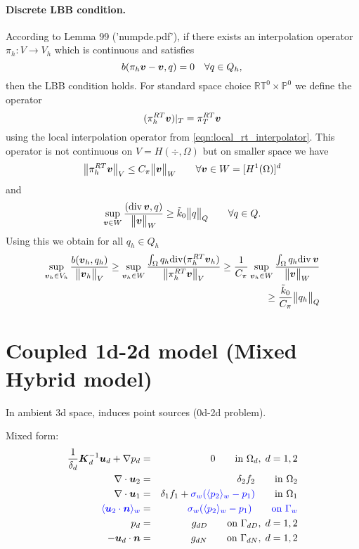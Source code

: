 \paragraph{Discrete LBB condition.}
According to Lemma 99 ('numpde.pdf'), if there exists an interpolation operator
$\pi_h: V\rightarrow V_h$ which is continuous and satisfies
\begin{equation}
    b(\pi_h\mathbf{\boldsymbol{v}}- \mathbf{\boldsymbol{v}}, q) = 0 \quad \forall q\in Q_h,\\ 
\end{equation}
then the LBB condition holds.
For standard space choice $\mathbb{RT}^0\times\mathbb{P}^0$ we define
the operator 
\begin{equation}
    (\pi^{RT}_h \mathbf{\boldsymbol{v}})|_T = \pi^{RT}_T \mathbf{\boldsymbol{v}}
\end{equation}
using the local interpolation operator from \eqref{eqn:local_rt_interpolator}.
This operator is not continuous on $V=H(\div,\Omega)$ but on
smaller space we have
\begin{equation}
    \bigl\Vert\pi^{RT}_h \mathbf{\boldsymbol{v}}\bigr\Vert_V \leq C_\pi \bigl\Vert\mathbf{\boldsymbol{v}}\bigr\Vert_W \qquad \forall \mathbf{\boldsymbol{v}}\in W=[H^1(\Omega)]^d
\end{equation}
and
\begin{equation}
    \sup_{\mathbf{\boldsymbol{v}}\in W} \frac{({\rm div}\,\mathbf{\boldsymbol{v}}, q)}{\bigl\Vert\mathbf{\boldsymbol{v}}\bigr\Vert_W} \geq \tilde{k}_0 \bigl\Vert q\bigr\Vert_Q \qquad \forall q\in Q.
\end{equation}
Using this we obtain for all $q_h\in Q_h$
\begin{align}
    \sup_{\mathbf{\boldsymbol{v}}_h\in V_h} \frac{b(\mathbf{\boldsymbol{v}}_h,q_h)}{\bigl\Vert\mathbf{\boldsymbol{v}}_h\bigr\Vert_V} \geq
    \sup_{\mathbf{\boldsymbol{v}}_h\in W} \frac{\int_{\Omega} q_h {\rm div} (\pi^{RT}_h \mathbf{\boldsymbol{v}}_h)}{\bigl\Vert\pi^{RT}_h \mathbf{\boldsymbol{v}}\bigr\Vert_V} \geq
    \frac{1}{C_\pi} \sup_{\mathbf{\boldsymbol{v}}_h\in W} \frac{\int_{\Omega} q_h {\rm div}\,\mathbf{\boldsymbol{v}}}{\bigl\Vert\mathbf{\boldsymbol{v}}\bigr\Vert_W}
    \nonumber\\ \geq \frac{\tilde{k}_0}{C_\pi}\bigl\Vert q_h\bigr\Vert_Q
\end{align}




\section{Coupled 1d-2d model (Mixed Hybrid model)}

In ambient 3d space, induces point sources (0d-2d problem).
  
  Mixed form:
  \begin{eqnarray}
\frac{1}{\delta_d} \mathbf{\boldsymbol{K}}_d^{-1}\mathbf{\boldsymbol{u}}_d + \nabla p_d &=& 0 \qquad \textrm{in } \Omega_d,\; d=1,2  \\
\nabla \cdot \mathbf{\boldsymbol{u}}_2 &=& \delta_2 f_2 \qquad \textrm{in } \Omega_2\\
\nabla \cdot \mathbf{\boldsymbol{u}}_1 &=& \delta_1 f_1 + {\color{blue}\sigma_w(\langle p_2\rangle_w-p_1)}\qquad \textrm{in } \Omega_1\\
\color{blue}\langle\mathbf{\boldsymbol{u}}_2 \cdot \mathbf{\boldsymbol{n}}\rangle_w &=& \color{blue}\sigma_w (\langle p_2\rangle_w - p_{1}) \qquad \textrm{on } \Gamma_w\\
p_d &=& g_{dD} \qquad \textrm{on } \Gamma_{dD},\; d=1,2 \\
-\mathbf{\boldsymbol{u}}_d \cdot \mathbf{\boldsymbol{n}} &=& g_{dN} \qquad \textrm{on } \Gamma_{dN},\; d=1,2
  \end{eqnarray}
  
